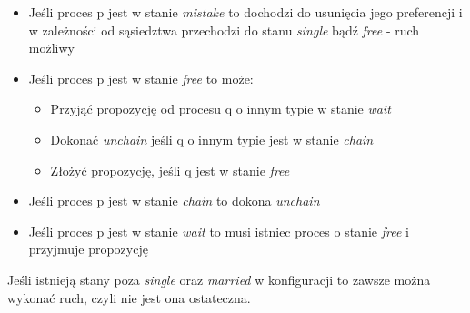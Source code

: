 \documentclass{article}
\begin{document}
    \begin{itemize}
        \item Jeśli proces p jest w stanie \textit{mistake} to dochodzi do usunięcia jego preferencji i w zależności od 
        sąsiedztwa przechodzi do stanu \textit{single} bądź \textit{free} - ruch możliwy
        \item Jeśli proces p jest w stanie \textit{free} to może:
        \begin{itemize}
            \item Przyjąć propozycję od procesu q o innym typie w stanie \textit{wait}
            \item Dokonać \textit{unchain} jeśli q o innym typie jest w stanie \textit{chain}
            \item Złożyć propozycję, jeśli q jest w stanie \textit{free}
        \end{itemize}
        \item Jeśli proces p jest w stanie \textit{chain} to dokona \textit{unchain}
        \item Jeśli proces p jest w stanie \textit{wait} to musi istniec proces o stanie \textit{free}
        i przyjmuje propozycję
    \end{itemize}
    Jeśli istnieją stany poza \textit{single} oraz \textit{married} w konfiguracji
    to zawsze można wykonać ruch, czyli nie jest ona ostateczna.
\end{document}
